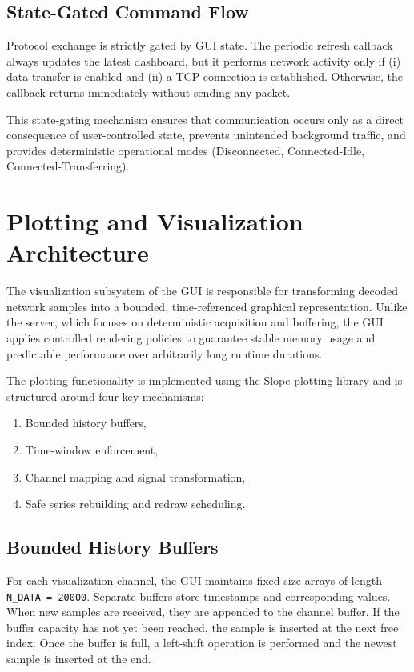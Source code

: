 \subsection{State-Gated Command Flow}
\label{sec:gui_state_gating}

Protocol exchange is strictly gated by GUI state. The periodic refresh callback always updates the latest dashboard, but it performs network activity only if (i) data transfer is enabled and (ii) a TCP connection is established. Otherwise, the callback returns immediately without sending any packet.

This state-gating mechanism ensures that communication occurs only as a direct consequence of user-controlled state, prevents unintended background traffic, and provides deterministic operational modes (Disconnected, Connected-Idle, Connected-Transferring).

\section{Plotting and Visualization Architecture}
\label{sec:gui_plotting}

The visualization subsystem of the GUI is responsible for transforming decoded network samples into a bounded, time-referenced graphical representation. Unlike the server, which focuses on deterministic acquisition and buffering, the GUI applies controlled rendering policies to guarantee stable memory usage and predictable performance over arbitrarily long runtime durations.

The plotting functionality is implemented using the Slope plotting library and is structured around four key mechanisms:

\begin{enumerate}
	\item Bounded history buffers,
	\item Time-window enforcement,
	\item Channel mapping and signal transformation,
	\item Safe series rebuilding and redraw scheduling.
\end{enumerate}

\subsection{Bounded History Buffers}
\label{sec:gui_bounded_buffers}

For each visualization channel, the GUI maintains fixed-size arrays of length \texttt{N\_DATA = 20000}. Separate buffers store timestamps and corresponding values. When new samples are received, they are appended to the channel buffer. If the buffer capacity has not yet been reached, the sample is inserted at the next free index. Once the buffer is full, a left-shift operation is performed and the newest sample is inserted at the end.

